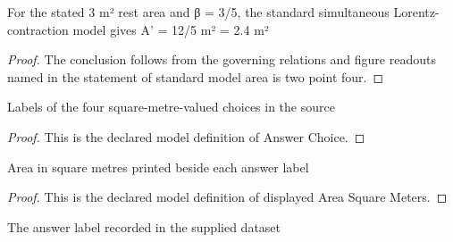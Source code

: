 \begin{lemma}
  \label{lem:physics:phyx-mini-0566:phyxminiproblems-problemphyxmini0566-standard-model-area-is-two-point-four}
  For the stated 3 m² rest area and β = 3/5, the standard simultaneous Lorentz-contraction model gives A' = 12/5 m² = 2.4 m²
\end{lemma}
\begin{proof}
  The conclusion follows from the governing relations and figure readouts named in the statement of standard model area is two point four.
\end{proof}
\begin{definition}
  \label{def:physics:phyx-mini-0566:phyxminiproblems-problemphyxmini0566-answerchoice}
  Labels of the four square-metre-valued choices in the source
\end{definition}
\begin{proof}
  This is the declared model definition of Answer Choice.
\end{proof}
\begin{definition}
  \label{def:physics:phyx-mini-0566:phyxminiproblems-problemphyxmini0566-displayedareasquaremeters}
  Area in square metres printed beside each answer label
\end{definition}
\begin{proof}
  This is the declared model definition of displayed Area Square Meters.
\end{proof}
\begin{definition}
  \label{def:physics:phyx-mini-0566:phyxminiproblems-problemphyxmini0566-recordeddatasetanswer}
  The answer label recorded in the supplied dataset
\end{definition}
